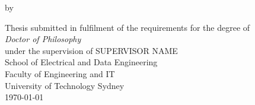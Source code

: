 \begin{titlepage}
\begin{center}

\Huge
\makeatletter
\textbf{\@title}

\Large

\vspace{3.cm}

by \textbf{\@author{}}

\vfill
\large
Thesis submitted in fulfilment of the requirements for the degree of\\
\textit{Doctor of Philosophy}\\
under the supervision of SUPERVISOR NAME\\
\vfill
\large
School of Electrical and Data Engineering\\
Faculty of Engineering and IT\\
University of Technology Sydney\\

\today
\makeatother

\end{center}
\end{titlepage}
